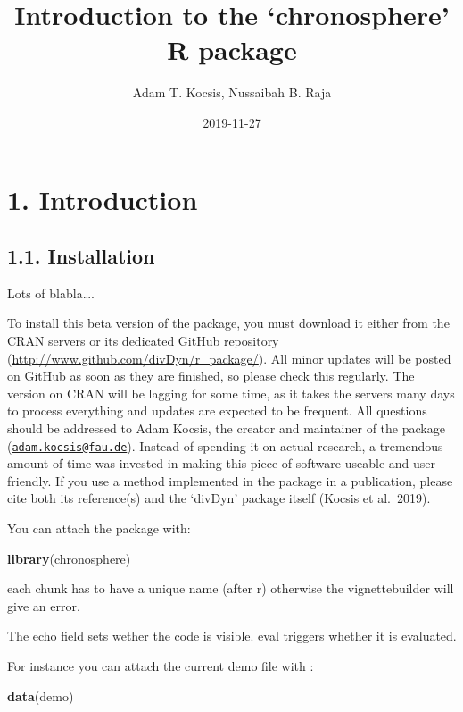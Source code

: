 \documentclass[]{article}
\title{Introduction to the `chronosphere' R package}
\author{Adam T. Kocsis, Nussaibah B. Raja}
\date{2019-11-27}
\newenvironment{Shaded}{\begin{snugshade}}{\end{snugshade}}
\newcommand{\KeywordTok}[1]{\textcolor[rgb]{0.13,0.29,0.53}{\textbf{#1}}}
\newcommand{\NormalTok}[1]{#1}
\begin{document}
\maketitle

\hypertarget{introduction}{%
\section{1. Introduction}\label{introduction}}

\hypertarget{installation}{%
\subsection{1.1. Installation}\label{installation}}

Lots of blabla\ldots.

To install this beta version of the package, you must download it either
from the CRAN servers or its dedicated GitHub repository
(\url{http://www.github.com/divDyn/r_package/}). All minor updates will
be posted on GitHub as soon as they are finished, so please check this
regularly. The version on CRAN will be lagging for some time, as it
takes the servers many days to process everything and updates are
expected to be frequent. All questions should be addressed to Adam
Kocsis, the creator and maintainer of the package
(\href{mailto:adam.kocsis@fau.de}{\nolinkurl{adam.kocsis@fau.de}}).
Instead of spending it on actual research, a tremendous amount of time
was invested in making this piece of software useable and user-friendly.
If you use a method implemented in the package in a publication, please
cite both its reference(s) and the `divDyn' package itself (Kocsis et
al.~2019).

You can attach the package with:

\begin{Shaded}
\begin{Highlighting}[]
\KeywordTok{library}\NormalTok{(chronosphere)}
\end{Highlighting}
\end{Shaded}

each chunk has to have a unique name (after r) otherwise the
vignettebuilder will give an error.

The echo field sets wether the code is visible. eval triggers whether it
is evaluated.

For instance you can attach the current demo file with :

\begin{Shaded}
\begin{Highlighting}[]
\KeywordTok{data}\NormalTok{(demo)}
\end{Highlighting}
\end{Shaded}
\end{document}
